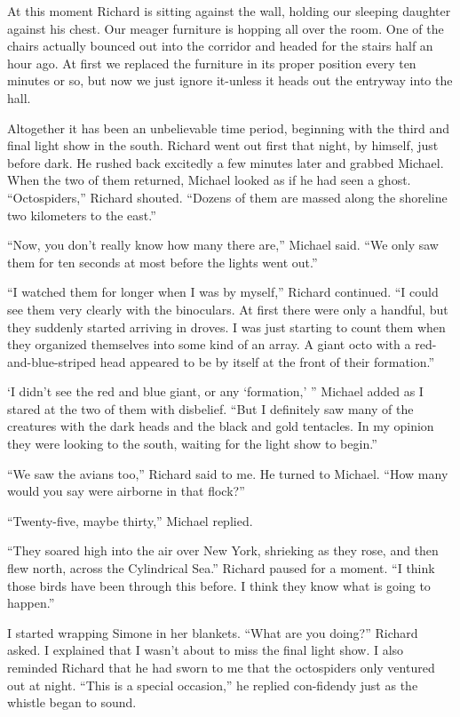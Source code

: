 \documentclass[]{article}
\begin{document}
At this moment Richard is sitting against the wall, holding our sleeping daughter against his chest. Our meager furniture is hopping all over the room. One of the chairs actually bounced out into the corridor and headed for the stairs half an hour ago. At first we replaced the furniture in its proper position every ten minutes or so, but now we just ignore it-unless it heads out the entryway into the hall.

Altogether it has been an unbelievable time period, beginning with the third and final light show in the south. Richard went out first that night, by himself, just before dark. He rushed back excitedly a few minutes later and grabbed Michael. When the two of them returned, Michael looked as if he had seen a ghost. “Octospiders,” Richard shouted. “Dozens of them are massed along the shoreline two kilometers to the east.”

“Now, you don’t really know how many there are,” Michael said. “We only saw them for ten seconds at most before the lights went out.”

“I watched them for longer when I was by myself,” Richard continued. “I could see them very clearly with the binoculars. At first there were only a handful, but they suddenly started arriving in droves. I was just starting to count them when they organized themselves into some kind of an array. A giant octo with a red-and-blue-striped head appeared to be by itself at the front of their formation.”

‘I didn’t see the red and blue giant, or any ‘formation,’ ” Michael added as I stared at the two of them with disbelief. “But I definitely saw many of the creatures with the dark heads and the black and gold tentacles. In my opinion they were looking to the south, waiting for the light show to begin.”

“We saw the avians too,” Richard said to me. He turned to Michael. “How many would you say were airborne in that flock?”

“Twenty-five, maybe thirty,” Michael replied.

“They soared high into the air over New York, shrieking as they rose, and then flew north, across the Cylindrical Sea.” Richard paused for a moment. “I think those birds have been through this before. I think they know what is going to happen.”

I started wrapping Simone in her blankets. “What are you doing?” Richard asked. I explained that I wasn’t about to miss the final light show. I also reminded Richard that he had sworn to me that the octospiders only ventured out at night. “This is a special occasion,” he replied con-fidendy just as the whistle began to sound.
\end{document}
